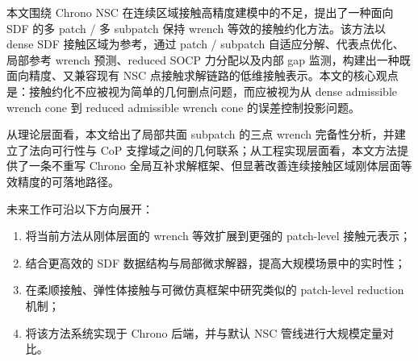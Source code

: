 \label{sec:conclusion}

本文围绕 Chrono NSC 在连续区域接触高精度建模中的不足，提出了一种面向 SDF 的多 patch / 多 subpatch 保持 wrench 等效的接触约化方法。该方法以 dense SDF 接触区域为参考，通过 patch / subpatch 自适应分解、代表点优化、局部参考 wrench 预测、reduced SOCP 力分配以及内部 gap 监测，构建出一种既面向精度、又兼容现有 NSC 点接触求解链路的低维接触表示。本文的核心观点是：接触约化不应被视为简单的几何删点问题，而应被视为从 dense admissible wrench cone 到 reduced admissible wrench cone 的误差控制投影问题。

从理论层面看，本文给出了局部共面 subpatch 的三点 wrench 完备性分析，并建立了法向可行性与 CoP 支撑域之间的几何联系；从工程实现层面看，本文方法提供了一条不重写 Chrono 全局互补求解框架、但显著改善连续接触区域刚体层面等效精度的可落地路径。

未来工作可沿以下方向展开：
\begin{enumerate}[label=(\arabic*)]
    \item 将当前方法从刚体层面的 wrench 等效扩展到更强的 patch-level 接触元表示；
    \item 结合更高效的 SDF 数据结构与局部微求解器，提高大规模场景中的实时性；
    \item 在柔顺接触、弹性体接触与可微仿真框架中研究类似的 patch-level reduction 机制；
    \item 将该方法系统实现于 Chrono 后端，并与默认 NSC 管线进行大规模定量对比。
\end{enumerate}
